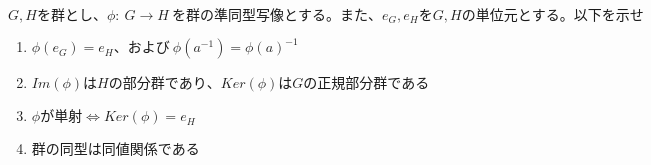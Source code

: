 \documentclass[dvipdfmx]{jsarticle}
\begin{document}
\begin{tcolorbox}[colframe=black!50,colback=white,colbacktitle=black!50,coltitle=white,fonttitle=\bfseries\sffamily,title=問題3]
  $G,Hを群とし、\phi: \ G \rightarrow H \ を群の準同型写像とする。また、e_G,e_HをG,Hの単位元とする。以下を示せ$
  \begin{enumerate}
    \item $\phi (e_G) = e_H、および \ \phi (a^{-1}) = \phi (a) ^{-1}$
    \item $Im(\phi)はHの部分群であり、Ker(\phi)はGの正規部分群である$
    \item $\phi が単射　 \Leftrightarrow Ker(\phi) = {e_H}$
    \item $群の同型は同値関係である$
  \end{enumerate}
\end{tcolorbox}
\end{document}
